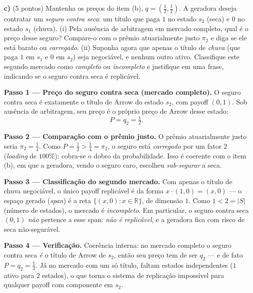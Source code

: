 \textbf{c)} (5 pontos) Mantenha os preços do item (b), $q=(\tfrac12,\tfrac12)$. A geradora deseja contratar um \emph{seguro contra seca}: um título que paga $1$ no estado $s_2$ (seca) e $0$ no estado $s_1$ (chuva). (i) Pela ausência de arbitragem em mercado completo, qual é o preço desse seguro? Compare-o com o prêmio atuarialmente justo $\pi_2$ e diga se ele está barato ou \emph{carregado}. (ii) Suponha agora que apenas o título de \emph{chuva} (que paga $1$ em $s_1$ e $0$ em $s_2$) seja negociável, e nenhum outro ativo. Classifique este segundo mercado como \emph{completo} ou \emph{incompleto} e justifique em uma frase, indicando se o seguro contra seca é replicável.
\resolucaobox{7.6cm}
\begin{solucao}
\textbf{Passo 1 --- Preço do seguro contra seca (mercado completo).} O seguro contra seca é exatamente o título de Arrow do estado $s_2$, com payoff $(0,1)$. Sob ausência de arbitragem, seu preço é o próprio preço de Arrow desse estado:
\[
P=q_2=\tfrac12.
\]

\textbf{Passo 2 --- Comparação com o prêmio justo.} O prêmio atuarialmente justo seria $\pi_2=\tfrac14$. Como $P=\tfrac12 > \tfrac14=\pi_2$, o seguro está \emph{carregado} por um fator $2$ (\emph{loading} de $100\%$): cobra-se o dobro da probabilidade. Isso é coerente com o item (b), em que a geradora, vendo o seguro caro, escolheu \emph{sub-segurar} a seca.

\textbf{Passo 3 --- Classificação do segundo mercado.} Com apenas o título de chuva negociável, o único payoff replicável é da forma $x\cdot(1,0)=(x,0)$ --- o espaço gerado (\emph{span}) é a reta $\{(x,0):x\in\mathbb{R}\}$, de dimensão $1$. Como $1<2=|S|$ (número de estados), o mercado é \emph{incompleto}. Em particular, o seguro contra seca $(0,1)$ \emph{não} pertence a esse span: \emph{não é replicável}, e a geradora fica com risco de seca não-segurável.

\textbf{Passo 4 --- Verificação.} Coerência interna: no mercado completo o seguro contra seca \emph{é} o título de Arrow de $s_2$, então seu preço tem de ser $q_2$ --- e de fato $P=q_2=\tfrac12$. Já no mercado com um só título, faltam estados independentes ($1$ ativo para $2$ estados), o que torna o sistema de replicação impossível para qualquer payoff com componente em $s_2$.


\end{solucao}
